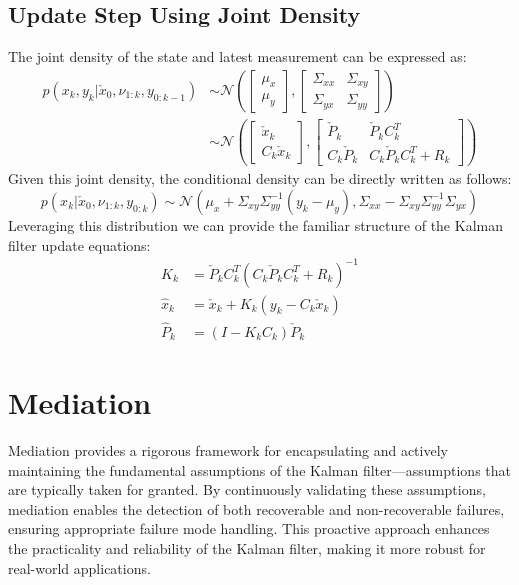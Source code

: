 \documentclass[a4paper]{article}
\begin{document}
	\subsection{Update Step Using Joint Density}
	The joint density of the state and latest measurement can be expressed as:
	\begin{align}
			p(x_k, y_k | \check{x}_{0}, \nu_{1:k}, y_{0:k-1}) & \sim \mathcal{N} \left(
		\begin{bmatrix}
			\mu_x \\
			\mu_y
		\end{bmatrix},
		\begin{bmatrix}
			\Sigma_{xx} & \Sigma_{xy} \\
			\Sigma_{yx} & \Sigma_{yy}
		\end{bmatrix} \right)\\
		& \sim \mathcal{N} \left(
		\begin{bmatrix}
			\check{x}_k \\
			C_k \check{x}_k
		\end{bmatrix},
		\begin{bmatrix}
			\check{P}_k & \check{P}_k C_k^T \\
			C_k \check{P}_k & C_k \check{P}_k C_k^T + R_k
		\end{bmatrix} \right)
	\end{align}
	Given this joint density, the conditional density can be directly written as follows:
	\begin{equation}
		p(x_k | \check{x}_{0}, \nu_{1:k}, y_{0:k}) \sim \mathcal{N} (\mu_x + \Sigma_{xy} \Sigma_{yy}^{-1} (y_k - \mu_y), \Sigma_{xx} -   \Sigma_{xy} \Sigma_{yy}^{-1} \Sigma_{yx})
	\end{equation}
	Leveraging this distribution we can provide the familiar structure of the Kalman filter update equations:
	\begin{align}
		K_k &=  \check{P}_k C_k^T (C_k \check{P}_k C_k^T + R_k)^{-1} \\
		\hat{x}_k &= \check{x}_k + K_k (y_k - C_k \check{x}_k) \\
		\hat{P}_k &= (I - K_k C_k) \check{P}_k
	\end{align}

	\section{Mediation}
	Mediation provides a rigorous framework for encapsulating and actively maintaining the fundamental assumptions of the Kalman filter—assumptions that are typically taken for granted. By continuously validating these assumptions, mediation enables the detection of both recoverable and non-recoverable failures, ensuring appropriate failure mode handling. This proactive approach enhances the practicality and reliability of the Kalman filter, making it more robust for real-world applications.
\end{document}

